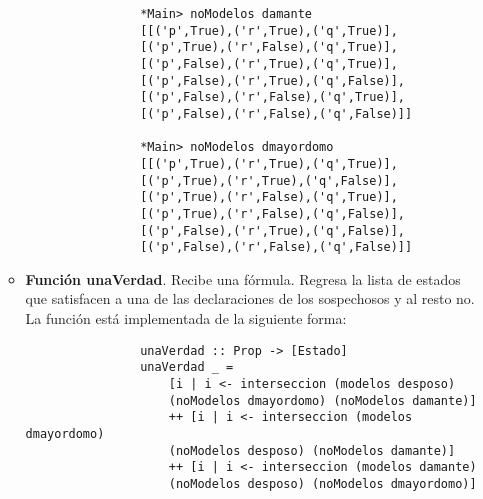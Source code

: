 \documentclass[letterpaper,12pt]{article}
\begin{document}
\begin{itemize}
\begin{itemize}
\begin{lstlisting}
                *Main> noModelos damante
                [[('p',True),('r',True),('q',True)],
                [('p',True),('r',False),('q',True)],
                [('p',False),('r',True),('q',True)],
                [('p',False),('r',True),('q',False)],
                [('p',False),('r',False),('q',True)],
                [('p',False),('r',False),('q',False)]]
                
                *Main> noModelos dmayordomo
                [[('p',True),('r',True),('q',True)],
                [('p',True),('r',True),('q',False)],
                [('p',True),('r',False),('q',True)],
                [('p',True),('r',False),('q',False)],
                [('p',False),('r',True),('q',False)],
                [('p',False),('r',False),('q',False)]]
            \end{lstlisting}

            \item \textbf{Función unaVerdad}. Recibe una fórmula. Regresa la 
            lista de estados que satisfacen a una de las declaraciones de los 
            sospechosos y al resto no. \\
            La función está implementada de la siguiente forma: 
            \begin{lstlisting}
                unaVerdad :: Prop -> [Estado]
                unaVerdad _ = 
                    [i | i <- interseccion (modelos desposo) 
                    (noModelos dmayordomo) (noModelos damante)] 
                    ++ [i | i <- interseccion (modelos dmayordomo) 
                    (noModelos desposo) (noModelos damante)] 
                    ++ [i | i <- interseccion (modelos damante) 
                    (noModelos desposo) (noModelos dmayordomo)]
            \end{lstlisting}


\end{itemize}
\end{itemize}
\end{document}
